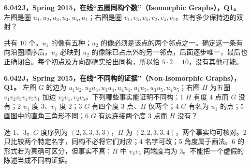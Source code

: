 \begin{exercise}\label{mit:6042-online-isomorphic-graphs-q1}
\textbf{6.042J，Spring 2015，在线“五圈同构个数”（Isomorphic Graphs），Q1。}
左图是圈 $u_1,u_2,u_3,u_4,u_5,u_1$；右图是圈 $v_1,v_3,v_5,v_2,v_4,v_1$。共有多少保持边的双射？
\end{exercise}
\begin{solution}
共有 $10$ 个。$u_1$ 的像有五种；$u_2$ 的像必须是该点的两个邻点之一。确定这一条有向沿圈顺序后，$u_3$ 必映到 $u_2$ 的像除已占点外的另一邻点，后面逐步唯一，最后也正确闭合。每个初点及方向都确实给出同构，所以恰 $5\cdot2=10$，没有其他可能。
\end{solution}

\begin{exercise}\label{mit:6042-online-non-isomorphic-graphs-q1}
\textbf{6.042J，Spring 2015，在线“不同构的证据”（Non-Isomorphic Graphs），Q1。}
左图 $G$ 的边为 $u_1u_2,u_2u_3,u_3u_4,u_4u_1,u_1u_5,u_3u_5,u_4u_5$；右图 $H$ 为五圈 $v_1v_2v_3v_4v_5v_1$ 加边 $v_2v_4,v_2v_5$。下列哪些事实能证明不同构：1 $H$ 有度 $4$ 点而 $G$ 没有；2 $u_1$ 度 $3$、$v_1$ 度 $2$；3 $G$ 有四个度 $3$ 点、$H$ 仅两个；4 $G$ 有名为 $u_1$ 的点；5 画图中的直角三角形不同；6 $G$ 有边连接两个度 $3$ 点而 $H$ 没有？
\end{exercise}
\begin{solution}
选 1、3。$G$ 度序列为 $(2,3,3,3,3)$，$H$ 为 $(2,2,3,3,4)$，两个事实均可核对。2 只比较两个特定名字，同构不必将它们对应；4 名字可改；5 角度属于画法。6 的形式若为真确可区分，但事实不真：$H$ 中 $v_4v_5$ 两端度均为 $3$。不能把一个虚假的陈述当成不同构证据。
\end{solution}

